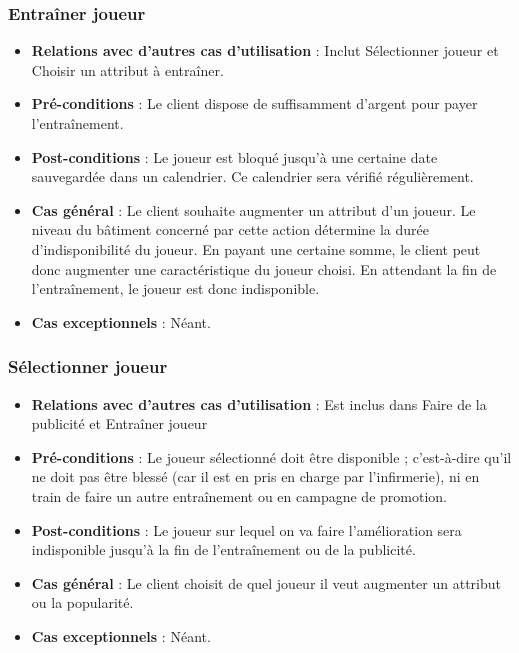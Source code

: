 \documentclass[a4paper,titlepage]{scrreprt}
\begin{document}
    \subsubsection{Entraîner joueur}
      \begin{itemize}
        \item \textbf{Relations avec d'autres cas d'utilisation}  : Inclut Sélectionner joueur et Choisir un attribut à entraîner.
        \item \textbf{Pré-conditions} : Le client dispose de suffisamment d’argent pour payer l’entraînement.
        \item \textbf{Post-conditions} : Le joueur est bloqué jusqu'à une certaine date sauvegardée dans un calendrier. Ce calendrier sera vérifié régulièrement.
        \item \textbf{Cas général} : Le client souhaite augmenter un attribut  d’un joueur. Le niveau du bâtiment concerné par cette action détermine la durée d'indisponibilité du joueur. En payant une certaine somme, le client peut donc augmenter une caractéristique du joueur choisi. En attendant la fin de l’entraînement, le joueur est donc indisponible.
        \item \textbf{Cas exceptionnels} : Néant.
      \end{itemize}
    \subsubsection{Sélectionner joueur}
      \begin{itemize}
        \item \textbf{Relations avec d'autres cas d'utilisation}  : Est inclus dans Faire de la publicité et Entraîner joueur
        \item \textbf{Pré-conditions} : Le joueur sélectionné doit être disponible ; c’est-à-dire qu’il ne doit pas être blessé (car il est en pris en charge par l'infirmerie), ni en train de faire un autre entraînement ou en campagne de promotion.
        \item \textbf{Post-conditions} : Le joueur sur lequel on va faire l’amélioration sera indisponible jusqu’à la fin de l’entraînement ou de la publicité.
        \item \textbf{Cas général} : Le client choisit de quel joueur il veut augmenter un attribut ou la popularité. 
        \item \textbf{Cas exceptionnels} : Néant.
      \end{itemize}
\end{document}
